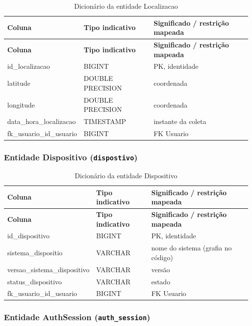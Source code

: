 \begin{longtable}{p{4.8cm}p{3.05cm}p{5.05cm}}
\caption{Dicionário da entidade Localizacao}\label{quad_localizacao}\\
\hline
\textbf{Coluna} & \textbf{Tipo indicativo} & \textbf{Significado / restrição mapeada} \\
\hline
\endfirsthead
\hline\textbf{Coluna} & \textbf{Tipo indicativo} & \textbf{Significado / restrição mapeada} \\
\hline
\endhead
id\_localizacao & BIGINT & PK, identidade \\
\hline
latitude & DOUBLE PRECISION & coordenada \\
\hline
longitude & DOUBLE PRECISION & coordenada \\
\hline
data\_hora\_localizacao & TIMESTAMP & instante da coleta \\
\hline
fk\_usuario\_id\_usuario & BIGINT & FK Usuario \\
\hline
\end{longtable}

\subsubsection{Entidade Dispositivo (\texttt{dispostivo})}

\begin{longtable}{p{4.8cm}p{3.05cm}p{5.05cm}}
\caption{Dicionário da entidade Dispositivo}\label{quad_dispositivo}\\
\hline
\textbf{Coluna} & \textbf{Tipo indicativo} & \textbf{Significado / restrição mapeada} \\
\hline
\endfirsthead
\hline\textbf{Coluna} & \textbf{Tipo indicativo} & \textbf{Significado / restrição mapeada} \\
\hline
\endhead
id\_dispositivo & BIGINT & PK, identidade \\
\hline
sistema\_dispositio & VARCHAR & nome do sistema (grafia no código) \\
\hline
versao\_sistema\_dispositivo & VARCHAR & versão \\
\hline
status\_dispositivo & VARCHAR & estado \\
\hline
fk\_usuario\_id\_usuario & BIGINT & FK Usuario \\
\hline
\end{longtable}

\subsubsection{Entidade AuthSession (\texttt{auth\_session})}

